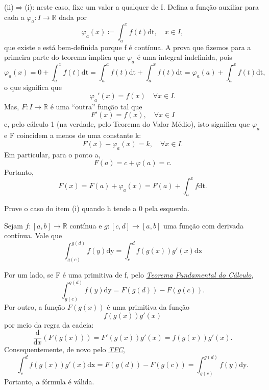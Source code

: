 \documentclass[../analysisII_notes.tex]{subfiles}
\begin{document}
\begin{proof*}
	(ii)\(\Rightarrow \)(i): neste caso, fixe um valor a qualquer de I. Defina a função auxiliar para cada a \(\varphi_a:I\rightarrow \mathbb{R}\) dada por
	\[
		\varphi_a(x)\coloneqq \int_{a}^{x}f(t) \mathrm{dt},\quad x\in I,
	\]
	que existe e está bem-definida porque f é contínua. A prova que fizemos para a primeira parte do teorema implica que \(\varphi_{a}\) é uma integral indefinida, pois
	\[
		\varphi_{a}(x) = 0 + \int_{a}^{x}f(t) \mathrm{dt} = \int_{a}^{a}f(t) \mathrm{dt} + \int_{a}^{x}f(t) \mathrm{dt} = \varphi_a(a) + \int_{a}^{x}f(t) \mathrm{dt},
	\]
	o que significa que
	\[
		\varphi_a'(x) = f(x) \quad \forall x\in I.
	\]
	Mas, \(F:I\rightarrow \mathbb{R}\) é uma ``outra'' função tal que
	\[
		F'(x) = f(x),\quad \forall x\in I
	\]
	e, pelo cálculo 1 (na verdade, pelo Teorema do Valor Médio), isto significa que \(\varphi_{a}\) e F coincidem a menos de uma constante k:
	\[
		F(x)-\varphi_a(x) = k,\quad \forall x\in I.
	\]
	Em particular, para o ponto a,
	\[
		F(a) = c + \varphi (a) = c.
	\]
	Portanto,
	\[
		F(x) = F(a) + \varphi_{a}(x) = F(a) + \int_{a}^{x}f \mathrm{dt}.
	\]
\end{proof*}

\begin{exr}
	Prove o caso do item (i) quando h tende a 0 pela esquerda.
\end{exr}

\begin{theorem*}
	Sejam \(f:[a, b]\rightarrow \mathbb{R}\) contínua e \(g:[c, d]\rightarrow [a, b]\) uma função com derivada contínua. Vale que
	\[
		\int_{g(c)}^{g(d)}f(y) \mathrm{dy} = \int_{c}^{d}f(g(x))g'(x) \mathrm{dx}
	\]
\end{theorem*}
\begin{proof*}
	Por um lado, se F é uma primitiva de f, pelo \hyperlink{ftc}{\textit{Teorema Fundamental do Cálculo}},
	\[
		\int_{g(c)}^{g(d)}f(y) \mathrm{dy} = F(g(d)) - F(g(c)).
	\]
	Por outro, a função \(F(g(x))\) é uma primitiva da função
	\[
		f(g(x))g'(x)
	\]
	por meio da regra da cadeia:
	\[
		\frac{\mathrm{d}}{\mathrm{d}x}(F(g(x))) = F'(g(x))g'(x) = f(g(x))g'(x).
	\]
	Consequentemente, de novo pelo \hyperlink{ftc}{\textit{TFC}},
	\[
		\int_{c}^{d}f(g(x))g'(x) \mathrm{dx} = F(g(d)) - F(g(c)) = \int_{g(c)}^{g(d)}f(y) \mathrm{dy}.
	\]
	Portanto, a fórmula é válida. \qedsymbol
\end{proof*}
\end{document}
